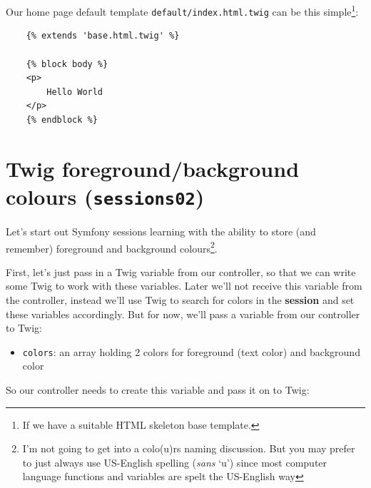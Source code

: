 \documentclass[a4paperpaper,openright]{book}
\newenvironment{Shaded}{}{}
\newcommand{\KeywordTok}[1]{\textcolor[rgb]{0.00,0.44,0.13}{\textbf{#1}}}
\newcommand{\NormalTok}[1]{#1}
\newcommand{\OtherTok}[1]{\textcolor[rgb]{0.00,0.44,0.13}{#1}}
\newcommand{\StringTok}[1]{\textcolor[rgb]{0.25,0.44,0.63}{#1}}
\begin{document}
Our home page default template \texttt{default/index.html.twig} can be
this simple\footnote{If we have a suitable HTML skeleton base template.}:

\begin{verbatim}
    {% extends 'base.html.twig' %}

    {% block body %}
    <p>
        Hello World
    </p>
    {% endblock %}
\end{verbatim}

\hypertarget{twig-foregroundbackground-colours-sessions02}{%
\section{\texorpdfstring{Twig foreground/background colours
(\texttt{sessions02})}{Twig foreground/background colours (sessions02)}}\label{twig-foregroundbackground-colours-sessions02}}

Let's start out Symfony sessions learning with the ability to store (and
remember) foreground and background colours\footnote{I'm not going to
  get into a colo(u)rs naming discussion. But you may prefer to just
  always use US-English spelling (\emph{sans} `u') since most computer
  language functions and variables are spelt the US-English way}.

First, let's just pass in a Twig variable from our controller, so that
we can write some Twig to work with these variables. Later we'll not
receive this variable from the controller, instead we'll use Twig to
search for colors in the \textbf{session} and set these variables
accordingly. But for now, we'll pass a variable from our controller to
Twig:

\begin{itemize}
\item
  \texttt{colors}: an array holding 2 colors for foreground (text color)
  and background color

\begin{Shaded}
\end{Shaded}
\end{itemize}

So our controller needs to create this variable and pass it on to Twig:
\end{document}
